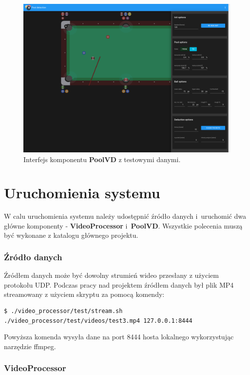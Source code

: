 \documentclass[12pt]{article}
\begin{document}
\begin{figure}[!htb]
    \centering
    \includegraphics[width=15cm]{./images/interface.png}
    \caption{Interfejs komponentu \textbf{PoolVD} z testowymi danymi.}
    \label{interface}
\end{figure}


\FloatBarrier


\section{Uruchomienia systemu}
W calu uruchomienia systemu należy udostępnić źródło danych i~uruchomić dwa główne komponenty - \textbf{VideoProcessor} i~\textbf{PoolVD}. Wszystkie polecenia muszą być wykonane z katalogu głównego projektu.

\subsubsection{Źródło danych}
Źródłem danych może być dowolny strumień wideo przesłany z użyciem protokołu UDP. Podczas pracy nad projektem źródłem danych był plik MP4 streamowany z użyciem skryptu za pomocą komendy:
\begin{lstlisting}
$ ./video_processor/test/stream.sh ./video_processor/test/videos/test3.mp4 127.0.0.1:8444
\end{lstlisting}
Powyższa komenda wysyła dane na port 8444 hosta lokalnego wykorzystując narzędzie ffmpeg.

\subsubsection{VideoProcessor}
\end{document}
